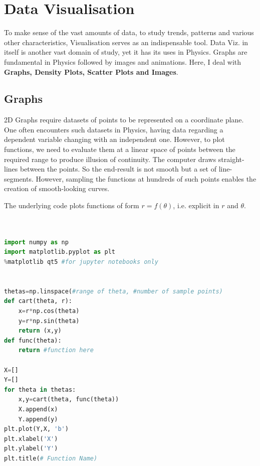 \section{Data Visualisation}
To make sense of the vast amounts of data, to study trends, patterns and various other characteristics, Visualisation serves as an indispensable tool. Data Viz. in itself is another vast domain of study, yet it has its uses in Physics. Graphs are fundamental in Physics followed by images and animations. Here, I deal with \textbf{Graphs, Density Plots, Scatter Plots and Images}.
\subsection{Graphs}
2D Graphs require datasets of points to be represented on a coordinate plane. One often encounters such datasets in Physics, having data regarding a dependent variable changing with an independent one. However, to plot functions, we need to evaluate them at a linear space of points between the required range to produce illusion of continuity. The computer draws straight-lines between the points. So the end-result is not smooth but a set of line-segments. However, sampling the functions at hundreds of such points enables the creation of smooth-looking curves.\medskip \\
\par The underlying code plots functions of form $r=f(\theta)$, i.e. explicit in $r$ and $\theta$.
\\
\\ \\
\begin{lstlisting}[language=Python, caption=Polar Plot, frame=single ]
import numpy as np
import matplotlib.pyplot as plt
%matplotlib qt5 #for jupyter notebooks only


thetas=np.linspace(#range of theta, #number of sample points) 
def cart(theta, r):
	x=r*np.cos(theta)
	y=r*np.sin(theta)
	return (x,y)
def func(theta):
	return #function here

X=[]
Y=[]
for theta in thetas:
	x,y=cart(theta, func(theta))
	X.append(x)
	Y.append(y)
plt.plot(Y,X, 'b')
plt.xlabel('X')
plt.ylabel('Y')
plt.title(# Function Name)
\end{lstlisting}
